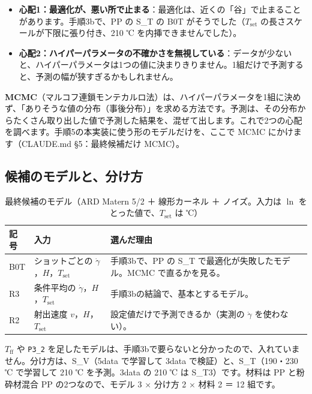 \documentclass[paper=a4paper,fontsize=10.5pt,line_length=44zw,number_of_lines=38]{jlreq}
\newcommand{\gd}{\dot{\gamma}}
\newcommand{\Tff}{T_{\mathrm{ff}}}
\newcommand{\Tset}{T_{\mathrm{set}}}
\newenvironment{points}{\begin{itemize}[label=$\triangleright$,leftmargin=1.5\zw,itemsep=0.3ex,topsep=0.5ex,parsep=0pt]}{\end{itemize}}
\newcommand{\pt}[1]{\item \textbf{#1}：}
\begin{document}
\begin{points}
\pt{心配1：最適化が、悪い所で止まる}最適化は、近くの「谷」で止まることがあります。手順3bで、PP の S\_T の B0T がそうでした（$\Tset$ の長さスケールが下限に張り付き、210 ℃ を内挿できませんでした）。
\pt{心配2：ハイパーパラメータの不確かさを無視している}データが少ないと、ハイパーパラメータは1つの値に決まりきりません。1組だけで予測すると、予測の幅が狭すぎるかもしれません。
\end{points}

\textbf{MCMC}（マルコフ連鎖モンテカルロ法）は、ハイパーパラメータを1組に決めず、「ありそうな値の分布（事後分布）」を求める方法です。予測は、その分布からたくさん取り出した値で予測した結果を、混ぜて出します。これで2つの心配を調べます。手順5の本実装に使う形のモデルだけを、ここで MCMC にかけます（CLAUDE.md §5：最終候補だけ MCMC）。

\subsection{候補のモデルと、分け方}
\begin{table}[H]
\caption{最終候補のモデル（ARD Matern 5/2 ＋ 線形カーネル ＋ ノイズ。入力は $\ln$ をとった値で、$\Tset$ は ℃）}
\begin{tabularx}{\linewidth}{@{}l>{\raggedright\arraybackslash}p{15\zw}X@{}}
\toprule
記号 & 入力 & 選んだ理由 \\
\midrule
B0T & ショットごとの $\gd$，$H$，$\Tset$ & 手順3bで、PP の S\_T で最適化が失敗したモデル。MCMC で直るかを見る。 \\
R3 & 条件平均の $\gd$，$H$，$\Tset$ & 手順3bの結論で、基本とするモデル。 \\
R2 & 射出速度 $v$，$H$，$\Tset$ & 設定値だけで予測できるか（実測の $\gd$ を使わない）。 \\
\bottomrule
\end{tabularx}
\end{table}

$\Tff$ や \texttt{P3\_2} を足したモデルは、手順3bで要らないと分かったので、入れていません。分け方は、S\_V（5data で学習して 3data で検証）と、S\_T（190・230 ℃ で学習して 210 ℃ を予測。3data の 210 ℃ は S\_T3）です。材料は PP と粉砕材混合 PP の2つなので、モデル 3 × 分け方 2 × 材料 2 ＝ 12 組です。
\end{document}
